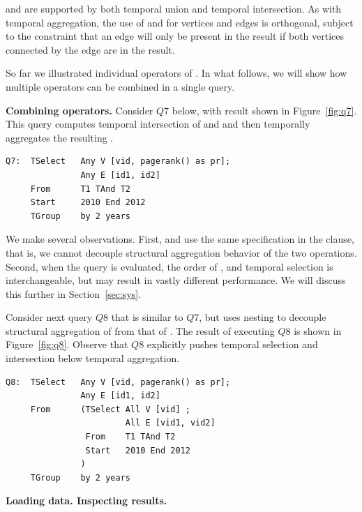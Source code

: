  and  are supported by both temporal union and
temporal intersection.  As with temporal aggregation, the use of
 and  for vertices and edges is orthogonal,
subject to the constraint that an edge will only be present in the
result if both vertices connected by the edge are in the result.

So far we illustrated individual operators of \ql.  In what follows,
we will show how multiple operators can be combined in a single query.

{\bf Combining operators.}  Consider $Q7$ below, with result shown in
Figure~\ref{fig:q7}. This query computes temporal intersection of
 and  and then temporally aggregates the resulting
\tg.

\begin{verbatim}
Q7:  TSelect   Any V [vid, pagerank() as pr]; 
               Any E [id1, id2]
     From      T1 TAnd T2
     Start     2010 End 2012
     TGroup    by 2 years
\end{verbatim}

We make several observations.  First,  and 
use the same specification in the  clause, that is, we
cannot decouple structural aggregation behavior of the two
operations. Second, when the query is evaluated, the order of
,  and temporal selection is
interchangeable, but may result in vastly different performance.  We
will discuss this further in Section~\ref{sec:sys}.


Consider next query $Q8$ that is similar to $Q7$, but uses nesting to
decouple structural aggregation of  from that of
. The result of executing $Q8$ is shown in
Figure~\ref{fig:q8}.  Observe that $Q8$ explicitly pushes temporal
selection and intersection below temporal aggregation.

\begin{verbatim}
Q8:  TSelect   Any V [vid, pagerank() as pr]; 
               Any E [id1, id2]
     From      (TSelect All V [vid] ; 
                        All E [vid1, vid2]
                From    T1 TAnd T2
                Start   2010 End 2012
               )
     TGroup    by 2 years
\end{verbatim}

{\bf Loading data.  Inspecting results.}

